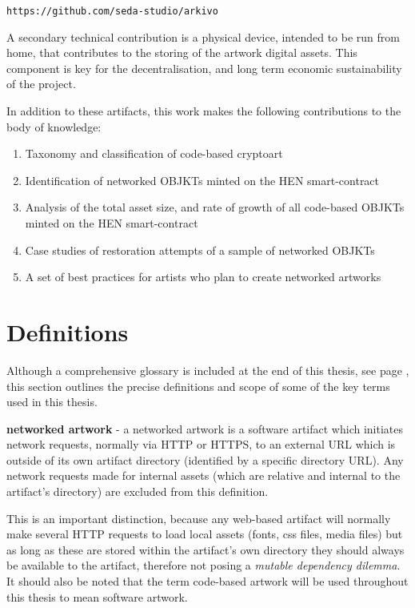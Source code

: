 \texttt{https://github.com/seda-studio/arkivo}

\vspace{0.5cm}

A secondary technical contribution is a physical device, intended to be run from home, that contributes to the storing of the artwork digital assets. This component is key for the decentralisation, and long term economic sustainability of the project. 

\vspace{0.5cm}

In addition to these artifacts, this work makes the following contributions to the body of knowledge:

\begin{enumerate}
    \item Taxonomy and classification of code-based cryptoart
    \item Identification of networked OBJKTs minted on the HEN smart-contract
    \item Analysis of the total asset size, and rate of growth of all code-based OBJKTs minted on the HEN smart-contract
    \item Case studies of restoration attempts of a sample of networked OBJKTs
    \item A set of best practices for artists who plan to create networked artworks
\end{enumerate}


\section{Definitions}
\label{sec:definitions}

Although a comprehensive glossary is included at the end of this thesis, see page \pageref{sec:glossary}, this section outlines the precise definitions and scope of some of the key terms used in this thesis.

\vspace{0.5cm}

\textbf{networked artwork} - a networked artwork is a software artifact which initiates network requests, normally via HTTP or HTTPS, to an external URL which is outside of its own artifact directory (identified by a specific directory URL). Any network requests made for internal assets (which are relative and internal to the artifact's directory) are excluded from this definition.

This is an important distinction, because any web-based artifact will normally make several HTTP requests to load local assets (fonts, css files, media files) but as long as these are stored within the artifact's own directory they should always be available to the artifact, therefore not posing a \emph{mutable dependency dilemma}. It should also be noted that the term code-based artwork will be used throughout this thesis to mean software artwork.

